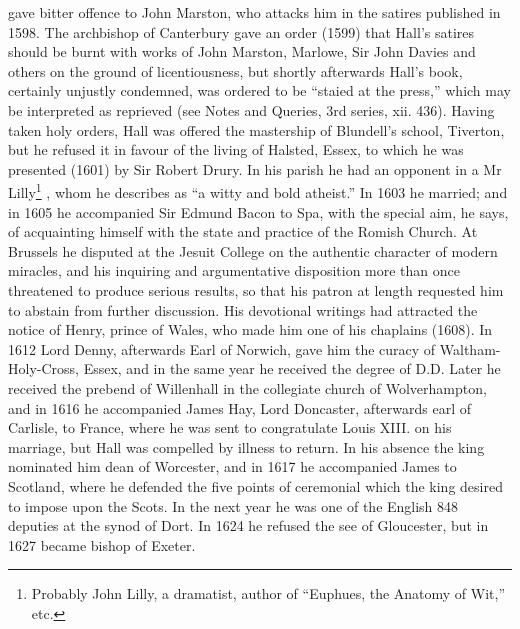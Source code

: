gave bitter offence to John Marston, who attacks him in the satires published in 1598. The archbishop of Canterbury gave an order (1599) that Hall's satires should be burnt with works of John Marston, Marlowe, Sir John Davies and others on the ground of licentiousness, but shortly afterwards Hall's book, certainly unjustly condemned, was ordered to be ``staied at the press,'' which may be interpreted as reprieved (see Notes and Queries, 3rd series, xii. 436). Having taken holy orders, Hall was offered the mastership of Blundell's school, Tiverton, but he refused it in favour of the living of Halsted, Essex, to which he was presented (1601) by Sir Robert Drury. In his parish he had an opponent in a Mr Lilly\footnote{Probably John Lilly, a dramatist, author of ``Euphues, the Anatomy of Wit,'' etc.} , whom he describes as ``a witty and bold atheist.'' In 1603 he married; and in 1605 he accompanied Sir Edmund Bacon to Spa, with the special aim, he says, of acquainting himself with the state and practice of the Romish Church. At Brussels he disputed at the Jesuit College on the authentic character of modern miracles, and his inquiring and argumentative disposition more than once threatened to produce serious results, so that his patron at length requested him to abstain from further discussion. His devotional writings had attracted the notice of Henry, prince of Wales, who made him one of his chaplains (1608). In 1612 Lord Denny, afterwards Earl of Norwich, gave him the curacy of Waltham-Holy-Cross, Essex, and in the same year he received the degree of D.D. Later he received the prebend of Willenhall in the collegiate church of Wolverhampton, and in 1616 he accompanied James Hay, Lord Doncaster, afterwards earl of Carlisle, to France, where he was sent to congratulate Louis XIII. on his marriage, but Hall was compelled by illness to return. In his absence the king nominated him dean of Worcester, and in 1617 he accompanied James to Scotland, where he defended the five points of ceremonial which the king desired to impose upon the Scots. In the next year he was one of the English 848 deputies at the synod of Dort. In 1624 he refused the see of Gloucester, but in 1627 became bishop of Exeter.

